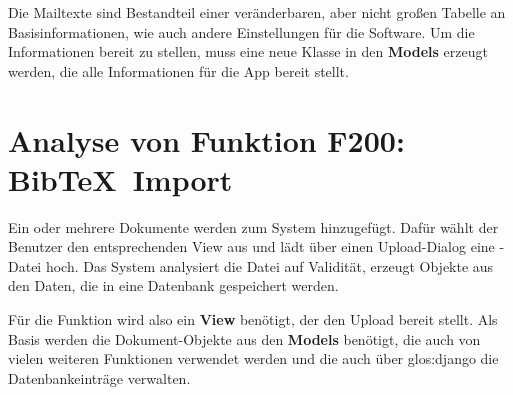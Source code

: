 Die Mailtexte sind Bestandteil einer veränderbaren, aber nicht großen Tabelle an
Basisinformationen, wie auch andere Einstellungen für die Software. Um die
Informationen bereit zu stellen, muss eine neue Klasse in den \textbf{Models}
erzeugt werden, die alle Informationen für die App bereit stellt.

\section{Analyse von Funktion F200: Bib\TeX\ Import}
Ein oder mehrere Dokumente werden zum System hinzugefügt. Dafür wählt der
Benutzer den entsprechenden View aus und lädt über einen Upload-Dialog eine
\BibTeX -Datei hoch. Das System analysiert die Datei auf Validität, erzeugt
Objekte aus den Daten, die in eine Datenbank gespeichert werden.

Für die Funktion wird also ein \textbf{View} benötigt, der den Upload bereit
stellt.  Als Basis werden die Dokument-Objekte aus den \textbf{Models} benötigt,
die auch von vielen weiteren Funktionen verwendet werden und die auch über
\gls{glos:django} die Datenbankeinträge verwalten.
